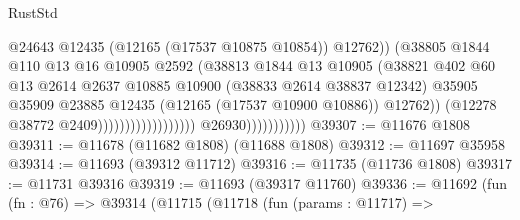 \begin{lexlean}{RustStd}
\begin{coremodule}
                                                              @24643
                                                              @12435
                                                              (@12165 (@17537 @10875 @10854))
                                                              @12762))
                                                          (@38805
                                                            @1844
                                                            @110
                                                            @13
                                                            @16
                                                            @10905
                                                            @2592
                                                            (@38813
                                                              @1844
                                                              @13
                                                              @10905
                                                              (@38821
                                                                @402
                                                                @60
                                                                @13
                                                                @2614
                                                                @2637
                                                                @10885
                                                                @10900
                                                                (@38833 @2614 @38837 @12342)
                                                                @35905
                                                                @35909
                                                                @23885
                                                                @12435
                                                                (@12165 (@17537 @10900 @10886))
                                                                @12762))
                                                            (@12278 @38772 @2409))))))))))))))))))
                          @26930)))))))))))
@39307 := @11676 @1808
@39311 := @11678 (@11682 @1808) (@11688 @1808)
@39312 := @11697 @35958
@39314 := @11693 (@39312 @11712)
@39316 := @11735 (@11736 @1808)
@39317 := @11731 @39316
@39319 := @11693 (@39317 @11760)
@39336 := @11692
    (fun (fn : @76) =>
    @39314
      (@11715
        (@11718
          (fun (params : @11717) =>

\end{coremodule}
\end{lexlean}
